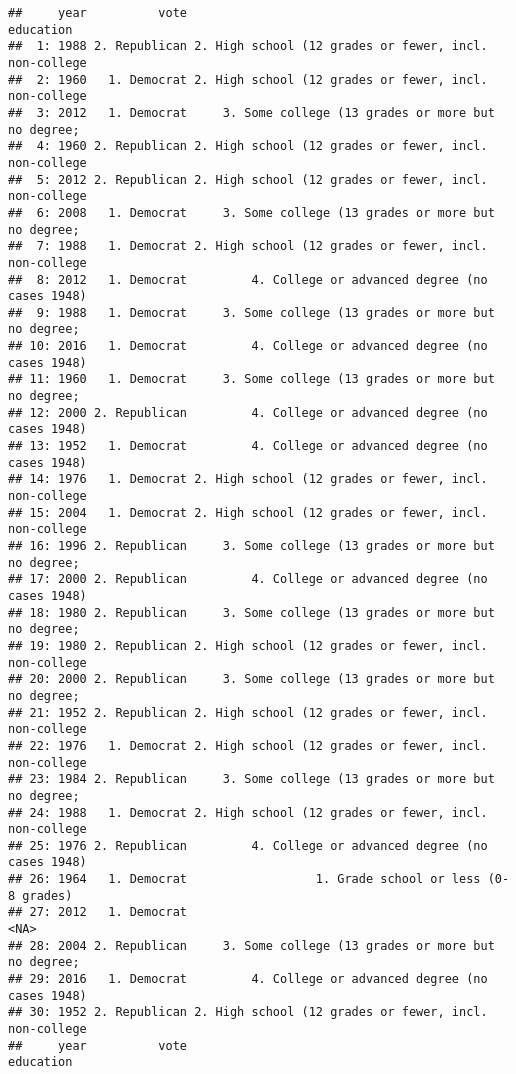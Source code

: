\documentclass[
]{article}
\begin{document}
\begin{verbatim}
##     year          vote                                             education
##  1: 1988 2. Republican 2. High school (12 grades or fewer, incl. non-college
##  2: 1960   1. Democrat 2. High school (12 grades or fewer, incl. non-college
##  3: 2012   1. Democrat     3. Some college (13 grades or more but no degree;
##  4: 1960 2. Republican 2. High school (12 grades or fewer, incl. non-college
##  5: 2012 2. Republican 2. High school (12 grades or fewer, incl. non-college
##  6: 2008   1. Democrat     3. Some college (13 grades or more but no degree;
##  7: 1988   1. Democrat 2. High school (12 grades or fewer, incl. non-college
##  8: 2012   1. Democrat         4. College or advanced degree (no cases 1948)
##  9: 1988   1. Democrat     3. Some college (13 grades or more but no degree;
## 10: 2016   1. Democrat         4. College or advanced degree (no cases 1948)
## 11: 1960   1. Democrat     3. Some college (13 grades or more but no degree;
## 12: 2000 2. Republican         4. College or advanced degree (no cases 1948)
## 13: 1952   1. Democrat         4. College or advanced degree (no cases 1948)
## 14: 1976   1. Democrat 2. High school (12 grades or fewer, incl. non-college
## 15: 2004   1. Democrat 2. High school (12 grades or fewer, incl. non-college
## 16: 1996 2. Republican     3. Some college (13 grades or more but no degree;
## 17: 2000 2. Republican         4. College or advanced degree (no cases 1948)
## 18: 1980 2. Republican     3. Some college (13 grades or more but no degree;
## 19: 1980 2. Republican 2. High school (12 grades or fewer, incl. non-college
## 20: 2000 2. Republican     3. Some college (13 grades or more but no degree;
## 21: 1952 2. Republican 2. High school (12 grades or fewer, incl. non-college
## 22: 1976   1. Democrat 2. High school (12 grades or fewer, incl. non-college
## 23: 1984 2. Republican     3. Some college (13 grades or more but no degree;
## 24: 1988   1. Democrat 2. High school (12 grades or fewer, incl. non-college
## 25: 1976 2. Republican         4. College or advanced degree (no cases 1948)
## 26: 1964   1. Democrat                  1. Grade school or less (0-8 grades)
## 27: 2012   1. Democrat                                                  <NA>
## 28: 2004 2. Republican     3. Some college (13 grades or more but no degree;
## 29: 2016   1. Democrat         4. College or advanced degree (no cases 1948)
## 30: 1952 2. Republican 2. High school (12 grades or fewer, incl. non-college
##     year          vote                                             education
\end{verbatim}
\end{document}
